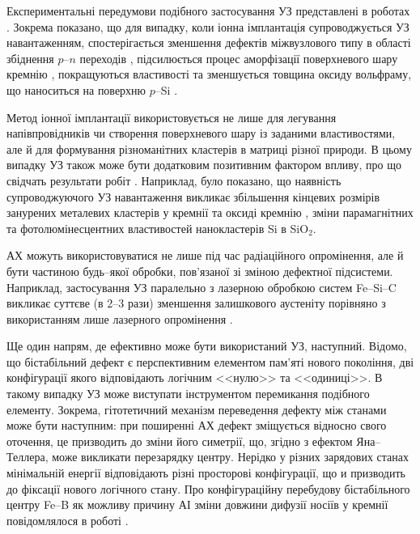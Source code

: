 Експериментальні передумови подібного застосування УЗ представлені в роботах \cite{YOlikh2005,RomanyukSST,ROMANYUK2005}.
Зокрема показано, що для випадку, коли іонна імплантація супроводжується УЗ навантаженням, спостерігається зменшення дефектів міжвузлового типу в області збіднення $p$--$n$ переходів \cite{YOlikh2005},
підсилюється процес аморфізації поверхневого шару кремнію \cite{RomanyukSST},
покращуються властивості та зменшується товщина оксиду вольфраму, що наноситься на поверхню $p$--Si \cite{ROMANYUK2005}.

Метод іонної імплантації використовується не лише для легування напівпровідників чи створення поверхневого шару із заданими властивостями, але й для формування різноманітних кластерів в матриці різної природи.
В цьому випадку УЗ також може бути додатковим позитивним фактором впливу, про що свідчать результати робіт \cite{Roman:2006JAP,Roman:2007APL,Roman:2010JAP,YOlikh2010JL}.
Наприклад, було показано, що наявність супроводжуючого УЗ навантаження викликає збільшення кінцевих розмірів занурених металевих кластерів у кремнії \cite{Roman:2006JAP} та оксиді кремнію \cite{Roman:2007APL}, зміни парамагнітних \cite{Roman:2010JAP} та фотолюмінесцентних \cite{YOlikh2010JL}властивостей нанокластерів Si в SiO$_2$.

АХ можуть використовуватися не лише під час радіаційного опромінення, але й бути частиною будь--якої обробки, пов'язаної зі зміною дефектної підсистеми.
Наприклад, застосування УЗ паралельно з лазерною обробкою систем Fe--Si--C викликає суттєве (в 2--3 рази) зменшення залишкового аустеніту порівняно з використанням лише лазерного опромінення \cite{US:FeSiC}.


Ще один напрям, де ефективно може бути використаний УЗ, наступний.
Відомо, що бістабільний дефект є перспективним елементом пам'яті нового покоління,
дві конфігурації якого відповідають логічним <<нулю>> та <<одиниці>>.
В такому випадку УЗ може виступати інструментом перемикання подібного елементу.
Зокрема, гітотетичний механізм переведення дефекту між станами може бути наступним:
при поширенні АХ дефект зміщується відносно свого оточення, це призводить до зміни його симетрії, що, згідно з ефектом Яна--Теллера, може викликати перезарядку центру.
Нерідко у різних зарядових станах мінімальній енергії відповідають різні просторові конфігурації, що и призводить до фіксації нового логічного стану.
Про конфігураційну перебудову бістабільного центру Fe--B як можливу причину АІ зміни довжини дифузії носіїв у кремнії повідомлялося в роботі \cite{OlikhFTT}.

